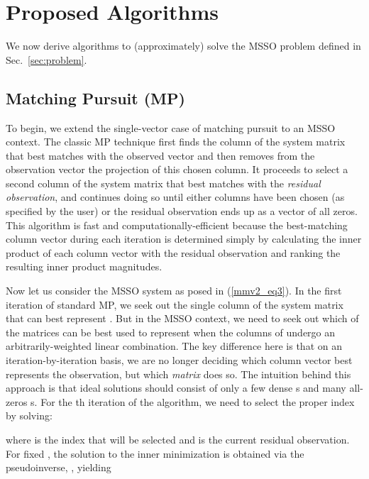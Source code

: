 \documentclass[final]{siamltex}
\newcommand{\la}[1]{\mbox{}}  \newcommand{\sst}[1]{\mbox{\scriptsize{#1}}}
\begin{document}
\section{Proposed Algorithms}
\label{sec:algorithms}

We
now derive algorithms to (approximately) solve
the MSSO problem defined in Sec.~\ref{sec:problem}.

\subsection{Matching Pursuit (MP)}

    To begin, we extend the single-vector case of matching pursuit
    \cite{Mal1993} to an MSSO context.  The classic MP technique first
    finds the column of the system matrix that best matches with the
    observed vector and then removes from the observation vector the
    projection of this chosen column.  It proceeds to select a second
    column of the system matrix that best matches with the
    {\em{residual observation}}, and continues doing so until either
     columns have been chosen (as specified by the user) or the
    residual observation ends up as a vector of all zeros.  This
    algorithm is fast and computationally-efficient because the
    best-matching column vector during each iteration is determined
    simply by calculating the inner product of each column vector with
    the residual observation and ranking the resulting inner product
    magnitudes.
    
    Now let us consider the MSSO system as posed in (\ref{mmv2_eq3}).  In
    the first iteration of standard MP, we seek out the single column
    of the system matrix that can best represent \la{d}.  But in
    the MSSO context, we need to seek out which of the  
    matrices can be best used to represent \la{d} when the columns of
     undergo an arbitrarily-weighted linear combination.
    The key difference here is that on an iteration-by-iteration
    basis, we are no longer deciding which column vector best
    represents the observation, but which {\em{matrix}} does so.  The
    intuition behind this approach is that ideal solutions should
    consist of only a few dense s and many all-zeros
    s.  For the th iteration of the algorithm, we 
    need to select the proper index  by solving:
    
    where  is the index that will be selected and 
    is the current residual observation.  For fixed , the solution
    to the inner minimization is obtained via the pseudoinverse,
    , yielding
    
\end{document}
